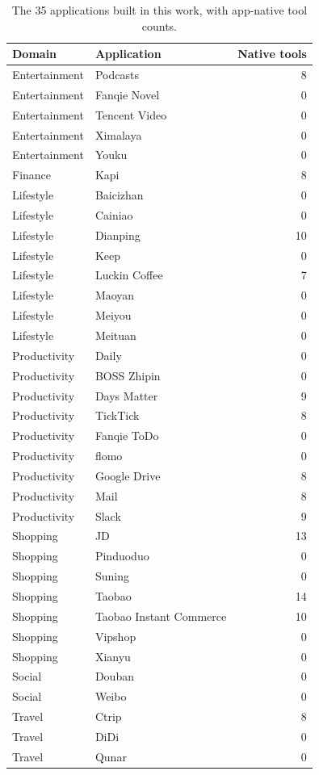 \begin{table}[t]
\centering
\small
\caption{The 35 applications built in this work, with app-native tool counts.}
\label{tab:app-new-tools}
\setlength{\tabcolsep}{5pt}
\begin{tabular}{llr}
\toprule
Domain & Application & Native tools \\
\midrule
Entertainment & Podcasts & 8 \\
Entertainment & Fanqie Novel & 0 \\
Entertainment & Tencent Video & 0 \\
Entertainment & Ximalaya & 0 \\
Entertainment & Youku & 0 \\
Finance & Kapi & 8 \\
Lifestyle & Baicizhan & 0 \\
Lifestyle & Cainiao & 0 \\
Lifestyle & Dianping & 10 \\
Lifestyle & Keep & 0 \\
Lifestyle & Luckin Coffee & 7 \\
Lifestyle & Maoyan & 0 \\
Lifestyle & Meiyou & 0 \\
Lifestyle & Meituan & 0 \\
Productivity & Daily & 0 \\
Productivity & BOSS Zhipin & 0 \\
Productivity & Days Matter & 9 \\
Productivity & TickTick & 8 \\
Productivity & Fanqie ToDo & 0 \\
Productivity & flomo & 0 \\
Productivity & Google Drive & 8 \\
Productivity & Mail & 8 \\
Productivity & Slack & 9 \\
Shopping & JD & 13 \\
Shopping & Pinduoduo & 0 \\
Shopping & Suning & 0 \\
Shopping & Taobao & 14 \\
Shopping & Taobao Instant Commerce & 10 \\
Shopping & Vipshop & 0 \\
Shopping & Xianyu & 0 \\
Social & Douban & 0 \\
Social & Weibo & 0 \\
Travel & Ctrip & 8 \\
Travel & DiDi & 0 \\
Travel & Qunar & 0 \\
\bottomrule
\end{tabular}
\end{table}

